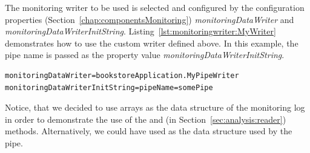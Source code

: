 \noindent The monitoring writer to be used is selected and configured by the \KiekerMonitoringPart{} %
configuration properties (Section~\ref{chap:componentsMonitoring}) %
\textit{monitoringDataWriter} and \textit{monitoringDataWriterInitString}. %
Listing~\ref{lst:monitoringwriter:MyWriter} demonstrates how to use the custom %
writer  defined above. In this example, the pipe name is %
passed as the property value \textit{monitoringDataWriterInitString}.

\setBashListing       
\begin{lstlisting}[label=lst:monitoringwriter:MyWriter]
monitoringDataWriter=bookstoreApplication.MyPipeWriter
monitoringDataWriterInitString=pipeName=somePipe
\end{lstlisting}

\enlargethispage{1cm}

\noindent Notice, that we decided to use  arrays as the data structure of the %
monitoring log in order to demonstrate the use of the  and %
 (in Section~\ref{sec:analysis:reader}) methods. %
Alternatively, we could have used  as the data structure %
used by the pipe. %